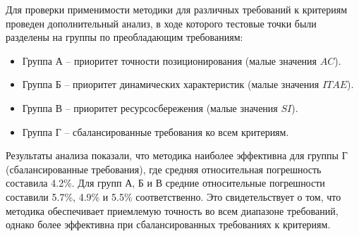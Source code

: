 Для проверки применимости методики для различных требований к критериям проведен
дополнительный анализ, в ходе которого тестовые точки были разделены на группы по преобладающим требованиям:
\begin{itemize}
	\item Группа А -- приоритет точности позиционирования (малые значения $AC$).
	\item Группа Б -- приоритет динамических характеристик (малые значения $ITAE$).
	\item Группа В -- приоритет ресурсосбережения (малые значения $SI$).
	\item Группа Г -- сбалансированные требования ко всем критериям.
\end{itemize}

Результаты анализа показали, что методика наиболее эффективна для группы Г (сбалансированные требования),
где средняя относительная погрешность составила \num{4.2}\%. Для групп А, Б и В средние
относительные погрешности составили \num{5.7}\%, \num{4.9}\% и \num{5.5}\% соответственно.
Это свидетельствует о том, что методика обеспечивает приемлемую точность во всем диапазоне
требований, однако более эффективна при сбалансированных требованиях к критериям.